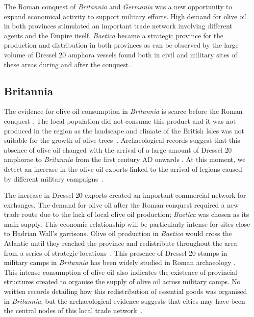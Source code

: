 The Roman conquest of \textit{Britannia} and \textit{Germania} was a new opportunity to expand economical activity to support military efforts. High demand for olive oil in both provinces stimulated an important trade network involving different agents and the Empire itself. \textit{Baetica} became a strategic province for the production and distribution in both provinces as can be observed by the large volume of Dressel 20 amphora vessels found both in civil and military sites of these areas during and after the conquest. 

\subsection{Britannia}
\label{sec:4}

The evidence for olive oil consumption in \textit{Britannia} is scarce before the Roman conquest \citep{funari_corpus_1996,carreras_abastecimiento_2003}. The local population did not consume this product and it was not produced in the region as the landscape and climate of the British Isles was not suitable for the growth of olive trees~\citep[161]{monfort_britanniaen_1998}. Archaeological records suggest that this absence of olive oil changed with the arrival of a large amount of Dressel 20 amphorae to \textit{Britannia} from the first century AD onwards \citep{peacock_amphorae_1991,carreras_britannia_1998}. At this moment, we detect an increase in the olive oil exports linked to the arrival of legions caused by different military campaigns~\citep[161]{monfort_britanniaen_1998}. 

The increase in Dressel 20 exports created an important commercial network for exchanges. The demand for olive oil after the Roman conquest required a new trade route due to the lack of local olive oil production; \textit{Baetica} was chosen as its main supply. This economic relationship will be particularly intense for sites close to Hadrian Wall's garrisons. Olive oil production in \textit{Baetica} would cross the Atlantic until they reached the province and redistribute throughout the area from a series of strategic locations~\citep{carreras_atlantic_2012}. This presence of Dressel 20 stamps in military camps in \textit{Britannia} has been widely studied in Roman archaeology \citep{williams_importation_1983,funari_corpus_1996,carreras_britannia_1998,carreras_abastecimiento_2003}. This intense consumption of olive oil also indicates the existence of provincial structures created to organise the supply of olive oil across military camps. No written records detailing how this redistribution of essential goods was organised in \textit{Britannia}, but the archaeological evidence suggests that cities may have been the central nodes of this local trade network~\citep{funari_economic_2005,orengo_seeds_2016}. 

